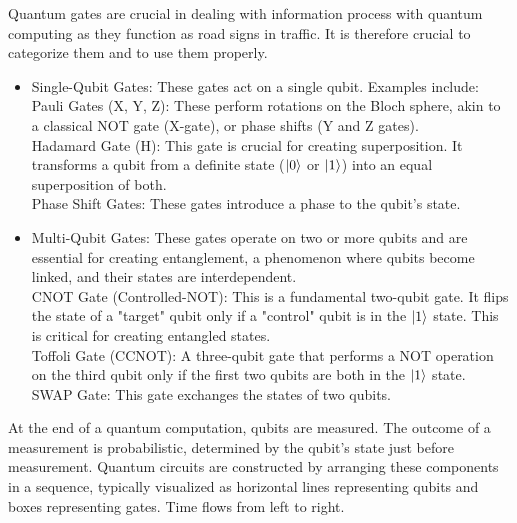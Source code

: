 \documentclass{article}
\begin{document}
Quantum gates are crucial in dealing with information process with quantum computing as they function as road signs in traffic. It is therefore crucial to categorize them and to use them properly.
\begin{itemize}

        \item Single-Qubit Gates: These gates act on a single qubit. Examples include:\\
            Pauli Gates (X, Y, Z): These perform rotations on the Bloch sphere, akin to a classical NOT gate (X-gate), or phase shifts (Y and Z gates).\\
            Hadamard Gate (H): This gate is crucial for creating superposition. It transforms a qubit from a definite state ($\ket{0}$ or $\ket{1}$) into an equal superposition of both.\\
            Phase Shift Gates: These gates introduce a phase to the qubit's state.

        \item Multi-Qubit Gates: These gates operate on two or more qubits and are essential for creating entanglement, a phenomenon where qubits become linked, and their states are interdependent.\\
            CNOT Gate (Controlled-NOT): This is a fundamental two-qubit gate. It flips the state of a "target" qubit only if a "control" qubit is in the $\ket{1}$ state. This is critical for creating entangled states.\\
            Toffoli Gate (CCNOT): A three-qubit gate that performs a NOT operation on the third qubit only if the first two qubits are both in the $\ket{1}$ state.\\
            SWAP Gate: This gate exchanges the states of two qubits.
\end{itemize}
 At the end of a quantum computation, qubits are measured. The outcome of a measurement is probabilistic, determined by the qubit's state just before measurement. Quantum circuits are constructed by arranging these components in a sequence, typically visualized as horizontal lines representing qubits and boxes representing gates. Time flows from left to right.\\
\end{document}
